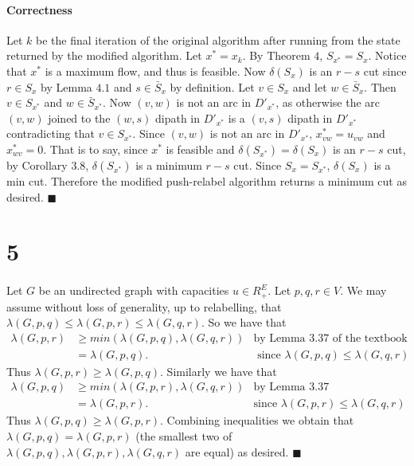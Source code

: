 \documentclass[letterpaper,12pt,oneside,onecolumn]{article}
\begin{document}
\paragraph{Correctness}
Let $k$ be the final iteration of the original algorithm after running from the state returned by the modified algorithm. Let $x^* = x_k$. By Theorem $4$, $S_{x^*} = S_x$. Notice that $x^*$ is a maximum flow, and thus is feasible. Now $\delta(S_x)$ is an $r-s$ cut since $r \in S_x$ by Lemma $4.1$ and $s \in \bar{S}_x$ by definition. Let $v \in S_x$ and let $w \in \bar{S}_x$. Then $v \in S_{x^*}$ and $w \in \bar{S}_{x^*}$. Now $(v,w)$ is not an arc in $D'_{x^*}$, as otherwise the arc $(v,w)$ joined to the $(w,s)$ dipath in $D'_{x^*}$ is a $(v,s)$ dipath in $D'_{x^*}$ contradicting that $v \in S_{x^*}$. Since $(v,w)$ is not an arc in $D'_{x^*}$, $x^*_{vw} = u_{vw}$ and $x^*_{wv} = 0$. That is to say, since $x^*$ is feasible and $\delta(S_{x^*}) = \delta(S_x)$ is an $r-s$ cut, by Corollary $3.8$, $\delta(S_{x^*})$ is a minimum $r-s$ cut. Since $S_x = S_{x^*}$, $\delta(S_x)$ is a min cut. Therefore the modified push-relabel algorithm returns a minimum cut as desired. $\blacksquare$

\section*{5}
\paragraph{}
Let $G$ be an undirected graph with capacities $u \in R_+^E$. Let $p,q,r \in V$. We may assume without loss of generality, up to relabelling, that $\lambda(G,p,q) \leq \lambda(G,p,r) \leq \lambda(G,q,r)$. So we have that 
\begin{align*}
\lambda(G,p,r) &\geq min(\lambda(G,p,q), \lambda(G,q,r)) &\text{by Lemma $3.37$ of the textbook}\\
&= \lambda(G,p,q). &\text{ since $\lambda(G,p,q) \leq \lambda(G,q,r)$}
\end{align*} 
Thus $\lambda(G,p,r) \geq \lambda(G,p,q)$. Similarly we have that
\begin{align*}
\lambda(G,p,q) &\geq min(\lambda(G,p,r), \lambda(G,q,r)) &\text{by Lemma $3.37$}\\
&= \lambda(G,p,r). &\text{since $\lambda(G,p,r) \leq \lambda(G,q,r)$}
\end{align*}
Thus $\lambda(G,p,q) \geq \lambda(G,p,r)$. Combining inequalities we obtain that $\lambda(G,p,q) = \lambda(G,p,r)$ (the smallest two of $\lambda(G,p,q),\lambda(G,p,r),\lambda(G,q,r)$ are equal) as desired. $\blacksquare$
\end{document}

